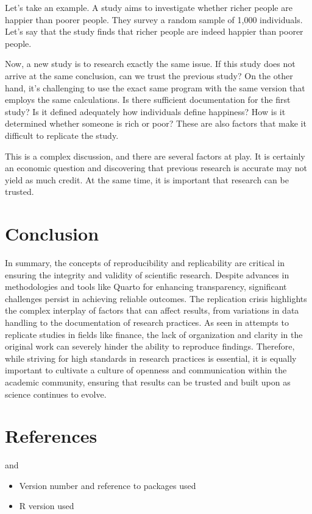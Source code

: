 \documentclass[
  a4paper,
]{article}
\providecommand{\tightlist}{%
  \setlength{\itemsep}{0pt}\setlength{\parskip}{0pt}}\usepackage{longtable,booktabs,array}
\begin{document}
Let's take an example. A study aims to investigate whether richer people
are happier than poorer people. They survey a random sample of 1,000
individuals. Let's say that the study finds that richer people are
indeed happier than poorer people.

Now, a new study is to research exactly the same issue. If this study
does not arrive at the same conclusion, can we trust the previous study?
On the other hand, it's challenging to use the exact same program with
the same version that employs the same calculations. Is there sufficient
documentation for the first study? Is it defined adequately how
individuals define happiness? How is it determined whether someone is
rich or poor? These are also factors that make it difficult to replicate
the study.

This is a complex discussion, and there are several factors at play. It
is certainly an economic question and discovering that previous research
is accurate may not yield as much credit. At the same time, it is
important that research can be trusted.

\section{Conclusion}\label{conclusion}

In summary, the concepts of reproducibility and replicability are
critical in ensuring the integrity and validity of scientific research.
Despite advances in methodologies and tools like Quarto for enhancing
transparency, significant challenges persist in achieving reliable
outcomes. The replication crisis highlights the complex interplay of
factors that can affect results, from variations in data handling to the
documentation of research practices. As seen in attempts to replicate
studies in fields like finance, the lack of organization and clarity in
the original work can severely hinder the ability to reproduce findings.
Therefore, while striving for high standards in research practices is
essential, it is equally important to cultivate a culture of openness
and communication within the academic community, ensuring that results
can be trusted and built upon as science continues to evolve.

\section{References}\label{references}

and

\begin{itemize}
\tightlist
\item
  Version number and reference to packages used
\item
  R version used
\end{itemize}
\end{document}
